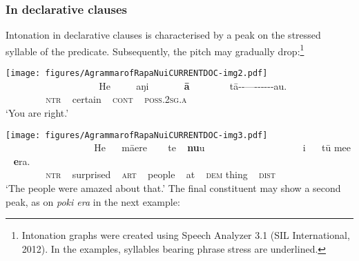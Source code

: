\subsubsection{In declarative clauses}\label{sec:2.4.2.1}

Intonation in declarative clauses is characterised by a peak on the stressed syllable of the predicate. Subsequently, the pitch may gradually drop:\footnote{\label{fn:59}Intonation graphs were created using Speech Analyzer 3.1 (SIL International, 2012). In the examples, syllables bearing phrase stress are underlined.}

  

\ea\label{ex:2.6}
\texttt{[image: figures/AgrammarofRapaNuiCURRENTDOC-img2.pdf]}\\
\gll ~ ~ ~ ~ ~~~~~~~~~~~~ He ~~~~ aŋi ~~~~~~ \textbf{{\ꞌ}ā} ~~~~~~~ tā\nobreakdash-\nobreakdash-\nobreakdash---\nobreakdash-\nobreakdash-\nobreakdash-\nobreakdash-\nobreakdash-\nobreakdash-{\ꞌ}au.\\
 ~ ~ ~ ~ ~ \textsc{ntr} ~ certain ~ \textsc{cont} ~ \textsc{poss.2sg.a}\\

\glt 
‘You are right.’ \textstyleExampleref{[R630-05.036]}
\z

\newpage 
\ea\label{ex:2.7}
\texttt{[image: figures/AgrammarofRapaNuiCURRENTDOC-img3.pdf]}\\
\gll ~ ~ ~ ~ ~~~~~~~~~~~ He ~~ māere ~~~ te ~ \textbf{nu}{\ꞌ}u ~~~~~~~~~~~~~~~~~~~ {\ꞌ}i ~~ tū me{\ꞌ}e ~ \textbf{e}ra.\\
 ~ ~ ~ ~ ~ \textsc{ntr} ~ surprised ~ \textsc{art} ~ people ~ at ~ \textsc{dem} thing ~ \textsc{dist}\\

\glt
‘The people were amazed about that.’ \textstyleExampleref{[R630-07.038]}
\z
The final constituent may show a second peak, as on \textit{poki era} in the next example:


